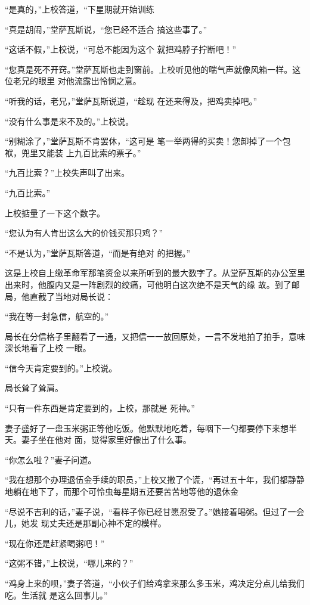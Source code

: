 \documentclass{article}
\begin{document}
“是真的，”上校答道，“下星期就开始训练

“真是胡闹，”堂萨瓦斯说，“您已经不适合
搞这些事了。” 

“这话不假，”上校说，“可总不能因为这个
就把鸡脖子拧断吧！” 

“您真是死不开窍。”堂萨瓦斯也走到窗前。上校听见他的喘气声就像风箱一样。这位老兄的眼里
对他流露出怜悯之意。 

“听我的话，老兄，”堂萨瓦斯说道，“趁现
在还来得及，把鸡卖掉吧。” 


“没有什么事是来不及的。”上校说。 

“别糊涂了，”堂萨瓦斯不肯罢休，“这可是
\newpage
笔一举两得的买卖！您卸掉了一个包袱，兜里又能装
上九百比索的票子。” 


“九百比索？”上校失声叫了出来。 


“九百比索。” 


上校掂量了一下这个数字。 

“您认为有人肯出这么大的价钱买那只鸡？”

“不是认为，”堂萨瓦斯答道，“而是有绝对
的把握。” 

这是上校自上缴革命军那笔资金以来所听到的最大数字了。从堂萨瓦斯的办公室里出来时，他腹内又是一阵剧烈的绞痛，可他明白这次绝不是天气的缘
故。到了邮局，他直截了当地对局长说： 


“我在等一封急信，航空的。” 

\newpage

局长在分信格子里翻看了一通，又把信一一放回原处，一言不发地拍了拍手，意味深长地看了上校
一眼。 


“信今天肯定要到的。”上校说。 


局长耸了耸肩。 

“只有一件东西是肯定要到的，上校，那就是
死神。” 

妻子盛好了一盘玉米粥正等他吃饭。他默默地吃着，每咽下一勺都要停下来想半天。妻子坐在他对
面，觉得家里好像出了什么事。 


“你怎么啦？”妻子问道。 

“我在想那个办理退伍金手续的职员，”上校又撒了个谎，“再过五十年，我们都静静地躺在地下了，而那个可怜虫每星期五还要苦苦地等他的退休金

\newpage

“尽说不吉利的话，”妻子说，“看样子你已经甘愿忍受了。”她接着喝粥。但过了一会儿，她发
现丈夫还是那副心神不定的模样。 


“现在你还是赶紧喝粥吧！” 


“这粥不错，”上校说，“哪儿来的？” 

“鸡身上来的呗，”妻子答道，“小伙子们给鸡拿来那么多玉米，鸡决定分点儿给我们吃。生活就
是这么回事儿。” 
\end{document}
